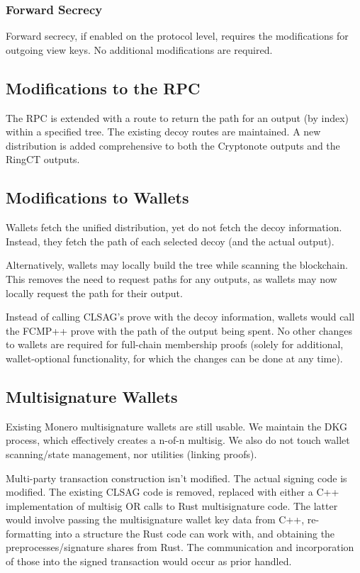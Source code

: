 \documentclass[]{article}
\begin{document}
\subsubsection{Forward Secrecy}

Forward secrecy, if enabled on the protocol level, requires the modifications for outgoing view keys. No additional modifications are required.

\subsection{Modifications to the RPC}

The RPC is extended with a route to return the path for an output (by index) within a specified tree. The existing decoy routes are maintained. A new distribution is added comprehensive to both the Cryptonote outputs and the RingCT outputs.

\subsection{Modifications to Wallets}

Wallets fetch the unified distribution, yet do not fetch the decoy information. Instead, they fetch the path of each selected decoy (and the actual output).

Alternatively, wallets may locally build the tree while scanning the blockchain. This removes the need to request paths for any outputs, as wallets may now locally request the path for their output.

Instead of calling CLSAG's prove with the decoy information, wallets would call the FCMP++ prove with the path of the output being spent. No other changes to wallets are required for full-chain membership proofs (solely for additional, wallet-optional functionality, for which the changes can be done at any time).

\subsection{Multisignature Wallets}

Existing Monero multisignature wallets are still usable. We maintain the DKG process, which effectively creates a n-of-n multisig. We also do not touch wallet scanning/state management, nor utilities (linking proofs).

Multi-party transaction construction isn't modified. The actual signing code is modified. The existing CLSAG code is removed, replaced with either a C++ implementation of multisig OR calls to Rust multisignature code. The latter would involve passing the multisignature wallet key data from C++, re-formatting into a structure the Rust code can work with, and obtaining the preprocesses/signature shares from Rust. The communication and incorporation of those into the signed transaction would occur as prior handled.
\end{document}
